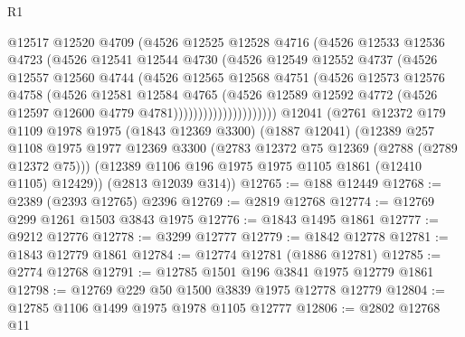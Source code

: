 \begin{lexlean}{R1}
\begin{coremodule}
                          @12517
                          @12520
                          @4709
                          (@4526
                            @12525
                            @12528
                            @4716
                            (@4526
                              @12533
                              @12536
                              @4723
                              (@4526
                                @12541
                                @12544
                                @4730
                                (@4526
                                  @12549
                                  @12552
                                  @4737
                                  (@4526
                                    @12557
                                    @12560
                                    @4744
                                    (@4526
                                      @12565
                                      @12568
                                      @4751
                                      (@4526
                                        @12573
                                        @12576
                                        @4758
                                        (@4526
                                          @12581
                                          @12584
                                          @4765
                                          (@4526
                                            @12589
                                            @12592
                                            @4772
                                            (@4526 @12597 @12600 @4779 @4781)))))))))))))))))))))
    @12041
    (@2761
      @12372
      @179
      @1109
      @1978
      @1975
      (@1843 @12369 @3300)
      (@1887 @12041)
      (@12389
        @257
        @1108
        @1975
        @1977
        @12369
        @3300
        (@2783 @12372 @75 @12369 (@2788 (@2789 @12372 @75)))
        (@12389 @1106 @196 @1975 @1975 @1105 @1861 (@12410 @1105) @12429))
      (@2813 @12039 @314))
@12765 := @188 @12449
@12768 := @2389 (@2393 @12765) @2396
@12769 := @2819 @12768
@12774 := @12769 @299 @1261 @1503 @3843 @1975
@12776 := @1843 @1495 @1861
@12777 := @9212 @12776
@12778 := @3299 @12777
@12779 := @1842 @12778
@12781 := @1843 @12779 @1861
@12784 := @12774 @12781 (@1886 @12781)
@12785 := @2774 @12768
@12791 := @12785 @1501 @196 @3841 @1975 @12779 @1861
@12798 := @12769 @229 @50 @1500 @3839 @1975 @12778 @12779
@12804 := @12785 @1106 @1499 @1975 @1978 @1105 @12777
@12806 := @2802 @12768 @11

\end{coremodule}
\end{lexlean}
